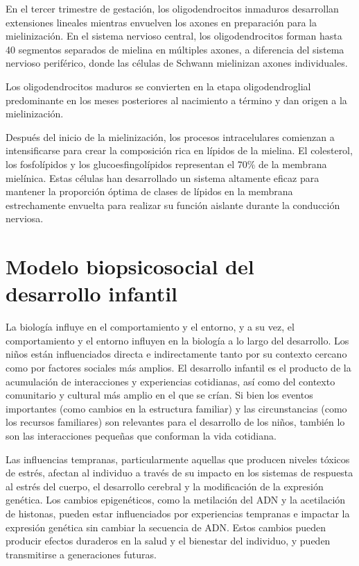 \documentclass[11pt,letterpaper]{report}
\begin{document}
En el tercer trimestre de gestación, los oligodendrocitos inmaduros desarrollan
extensiones lineales mientras envuelven los axones en preparación para la
mielinización. En el sistema nervioso central, los oligodendrocitos forman
hasta 40 segmentos separados de mielina en múltiples axones, a diferencia del
sistema nervioso periférico, donde las células de Schwann mielinizan axones
individuales. \cite{Polin124}

Los oligodendrocitos maduros se convierten en la etapa oligodendroglial
predominante en los meses posteriores al nacimiento a término y dan origen a la
mielinización. \cite{Polin124}

Después del inicio de la mielinización, los procesos intracelulares comienzan a
intensificarse para crear la composición rica en lípidos de la mielina. El
colesterol, los fosfolípidos y los glucoesfingolípidos representan el 70\% de
la membrana mielínica. Estas células han desarrollado un sistema altamente
eficaz para mantener la proporción óptima de clases de lípidos en la membrana
estrechamente envuelta para realizar su función aislante durante la conducción
nerviosa. \cite{Polin124}

\section{Modelo biopsicosocial del desarrollo infantil}
La biología influye en el comportamiento y el entorno, y a su vez, el
comportamiento y el entorno influyen en la biología a lo largo del desarrollo.
Los niños están influenciados directa e indirectamente tanto por su contexto
cercano como por factores sociales más amplios. El desarrollo infantil es el
producto de la acumulación de interacciones y experiencias cotidianas, así como
del contexto comunitario y cultural más amplio en el que se crían. Si bien los
eventos importantes (como cambios en la estructura familiar) y las
circunstancias (como los recursos familiares) son relevantes para el desarrollo
de los niños, también lo son las interacciones pequeñas que conforman la vida
cotidiana. \cite{Feldman3}

Las influencias tempranas, particularmente aquellas que producen niveles
tóxicos de estrés, afectan al individuo a través de su impacto en los sistemas
de respuesta al estrés del cuerpo, el desarrollo cerebral y la modificación de
la expresión genética. Los cambios epigenéticos, como la metilación del ADN y
la acetilación de histonas, pueden estar influenciados por experiencias
tempranas e impactar la expresión genética sin cambiar la secuencia de ADN.
Estos cambios pueden producir efectos duraderos en la salud y el bienestar del
individuo, y pueden transmitirse a generaciones futuras. \cite{Nelson19}
\end{document}
